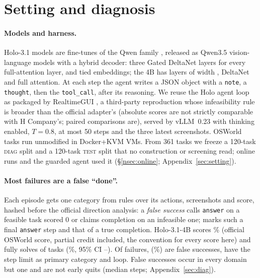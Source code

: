 \section{Setting and diagnosis}
\label{nsec:diag}
\paragraph{Models and harness.} Holo-3.1 models are fine-tunes of the Qwen family \citep{hcompany2026holo31}, released as Qwen3.5 vision-language models with a hybrid decoder: three Gated DeltaNet layers for every full-attention layer, and tied embeddings; the 4B has \cfgBigLayers{} layers of width \cfgBigHidden, \cfgBigNLinear{} DeltaNet and \cfgBigNFull{} full attention. At each step the agent writes a JSON object with a \texttt{note}, a \texttt{thought}, then the \texttt{tool\_call}, after its reasoning. We reuse the Holo agent loop as packaged by RealtimeGUI \citep{realtimegui}, a third-party reproduction whose infeasibility rule is broader than the official adapter's (absolute scores are not strictly comparable with H Company's; paired comparisons are), served by vLLM~0.23 \citep{kwon2023vllm} with thinking enabled, $T=0.8$, at most 50 steps and the three latest screenshots. OSWorld \citep{xie2024osworld} tasks run unmodified in Docker+KVM VMs. From 361 tasks we freeze a 120-task \textsc{diag} split and a 120-task \textsc{test} split that no construction or screening read; \onNTestRuns{} online runs and the guarded agent used it (\S\ref{nsec:online}; Appendix~\ref{sec:setting}). %

\paragraph{Most failures are a false ``done''.} Each episode gets one category from rules over its actions, screenshots and score, hashed before the official direction analysis: a \emph{false success} calls \texttt{answer} on a feasible task scored 0 or claims completion on an infeasible one; \fsp{} marks such a final \texttt{answer} step and \fsm{} that of a true completion. Holo-3.1-4B scores \oswMeanScorePct\% (official OSWorld score, partial credit included, the convention for every score here) and fully solves \oswNSuccess{} of \oswNScored{} tasks (\oswSuccessPct\%, 95\% CI \oswSuccessLo--\oswSuccessHi). Of \oswNFail{} failures, \oswCatFalseSuccess{} (\oswFsPct\%) are false successes, \oswCatStepLimit{} have the step limit as primary category and \oswCatLoop{} loop. False successes occur in every domain but one and are not early quits (median \oswFsMedianSteps{} steps; Appendix~\ref{sec:diag}).

